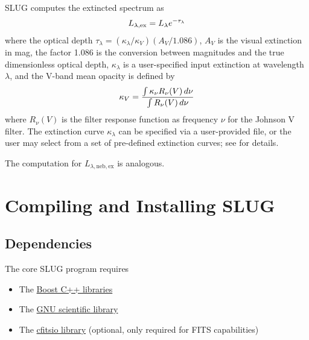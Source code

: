 \documentclass[letterpaper,10pt,english]{sphinxmanual}
\begin{document}
SLUG computes the extincted spectrum as
\begin{gather}
\begin{split}L_{\lambda,\mathrm{ex}} = L_{\lambda} e^{-\tau_\lambda}\end{split}\notag
\end{gather}
where the optical depth \(\tau_\lambda = (\kappa_\lambda / \kappa_V) (A_V/1.086)\), \(A_V\) is the visual extinction in mag, the factor 1.086 is the conversion between magnitudes and the true dimensionless optical depth, \(\kappa_\lambda\) is a user-specified input extinction at wavelength \(\lambda\), and the V-band mean opacity is defined by
\begin{gather}
\begin{split}\kappa_V = \frac{\int \kappa_\nu R_\nu(V) \, d\nu}{\int R_\nu(V) \, d\nu}\end{split}\notag
\end{gather}
where \(R_\nu(V)\) is the filter response function as frequency \(\nu\) for the Johnson V filter. The extinction curve \(\kappa_\lambda\) can be specified via a user-provided file, or the user may select from a set of pre-defined extinction curves; see {\hyperref[parameters:ssec-ism-keywords]{\emph{}}} for details.

The computation for \(L_{\lambda,\mathrm{neb,ex}}\) is analogous.


\chapter{Compiling and Installing SLUG}
\label{compiling::doc}\label{compiling:compiling-and-installing-slug}

\section{Dependencies}
\label{compiling:dependencies}
The core SLUG program requires
\begin{itemize}
\item {} 
The \href{http://www.boost.org/}{Boost C++ libraries}

\item {} 
The \href{http://www.gnu.org/software/gsl/}{GNU scientific library}

\item {} 
The \href{http://heasarc.gsfc.nasa.gov/fitsio/fitsio.html}{cfitsio library} (optional, only required for FITS capabilities)

\end{itemize}
\end{document}
